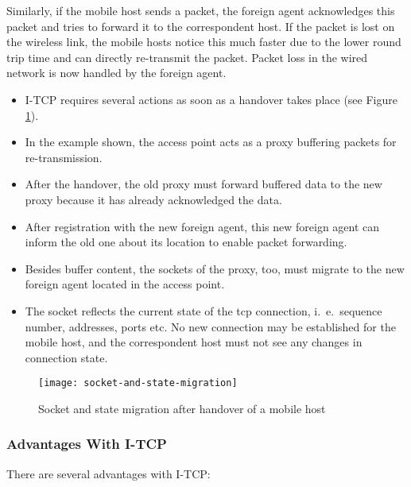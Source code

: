 Similarly, if the mobile host sends a packet, the foreign agent acknowledges this packet and tries to forward it to the correspondent host. If the packet is lost on the wireless link, the mobile hosts notice this much faster due to the lower round trip time and can directly re-transmit the packet. Packet loss in the wired network is now handled by the foreign agent.


\begin{itemize}
	\item I-TCP requires several actions as soon as a handover takes place (see Figure \ref{fig:socket-state-migration}). 
	\item In the example shown, the access point acts as a proxy buffering packets for re-transmission. 
	\item After the handover, the old proxy must forward buffered data to the new proxy because it has already acknowledged the data. 
	\item After registration with the new foreign agent, this new foreign agent can inform the old one about its location to enable packet forwarding. 
	\item Besides buffer content, the sockets of the proxy, too, must migrate to the new foreign agent located in the access point. 
	\item The socket reflects the current state of the \gls{tcp} connection, i.\ e.\, sequence number, addresses, ports etc. No new connection may be
	established for the mobile host, and the correspondent host must not see any changes in connection state.
\end{itemize}



\begin{figure}[hb!]
	\centering
	\texttt{[image: socket-and-state-migration]}
	\caption{Socket and state migration after handover of a mobile host}\label{fig:socket-state-migration}
\end{figure}

\subsubsection[Advantages]{Advantages With I-TCP}
There are several advantages with I-TCP:

